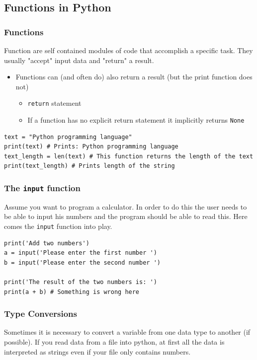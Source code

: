 \documentclass[10pt, a4paper]{beamer} %
\begin{document}
\subsection{Functions in Python} %
\label{sub:functions}
\begin{frame}\frametitle{Functions}
  Function are self contained modules of code that accomplish a specific task. They usually "accept" input data and "return" a result.
  \begin{itemize}
    \begin{lstlisting}
name = "Some name"
print(name) # Some name is used inside the print function -> the print function accepts the input and prints it to the console
    \end{lstlisting}
    \item Functions can (and often do) also return a result (but the print function does not)
          \begin{itemize}
            \item \lstinline!return! statement
            \item If a function has no explicit return statement it implicitly returns \lstinline!None!
          \end{itemize}
  \end{itemize}

  \begin{examples}
    \begin{lstlisting}
text = "Python programming language"
print(text) # Prints: Python programming language
text_length = len(text) # This function returns the length of the text
print(text_length) # Prints length of the string
  \end{lstlisting}
  \end{examples}
  \framebreak
  \frametitle{The \lstinline!input! function}

  Assume you want to program a calculator.
  In order to do this the user needs to be able to input his numbers and the program should be able to read this.
  Here comes the \lstinline!input! function into play.

  \begin{lstlisting}
print('Add two numbers')
a = input('Please enter the first number ')
b = input('Please enter the second number ')

print('The result of the two numbers is: ')
print(a + b) # Something is wrong here
\end{lstlisting}


  \framebreak
  \frametitle{Type Conversions}
  Sometimes it is necessary to convert a variable from one data type to another (if possible). If you
  read data from a file into python, at first all the data is interpreted as strings even if your file only
  contains numbers.


\end{frame}
\end{document}
